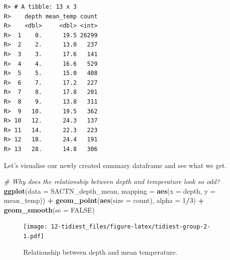 \documentclass[]{book}
\newenvironment{Shaded}{\begin{snugshade}}{\end{snugshade}}
\newcommand{\KeywordTok}[1]{\textcolor[rgb]{0.13,0.29,0.53}{\textbf{#1}}}
\newcommand{\DataTypeTok}[1]{\textcolor[rgb]{0.13,0.29,0.53}{#1}}
\newcommand{\DecValTok}[1]{\textcolor[rgb]{0.00,0.00,0.81}{#1}}
\newcommand{\StringTok}[1]{\textcolor[rgb]{0.31,0.60,0.02}{#1}}
\newcommand{\CommentTok}[1]{\textcolor[rgb]{0.56,0.35,0.01}{\textit{#1}}}
\newcommand{\OtherTok}[1]{\textcolor[rgb]{0.56,0.35,0.01}{#1}}
\newcommand{\OperatorTok}[1]{\textcolor[rgb]{0.81,0.36,0.00}{\textbf{#1}}}
\newcommand{\NormalTok}[1]{#1}
\theoremstyle{definition}
\theoremstyle{definition}
\theoremstyle{definition}
\theoremstyle{remark}
\begin{document}
\begin{Shaded}
\end{Shaded}

\begin{verbatim}
R> # A tibble: 13 x 3
R>    depth mean_temp count
R>    <dbl>     <dbl> <int>
R>  1    0.      19.5 26299
R>  2    2.      13.0   237
R>  3    3.      17.6   141
R>  4    4.      16.6   529
R>  5    5.      15.0   408
R>  6    7.      17.2   227
R>  7    8.      17.8   201
R>  8    9.      13.8   311
R>  9   10.      19.5   362
R> 10   12.      24.3   137
R> 11   14.      22.3   223
R> 12   18.      24.4   191
R> 13   28.      14.8   306
\end{verbatim}

Let's visualise our newly created summary dataframe and see what we get.

\begin{Shaded}
\begin{Highlighting}[]
\CommentTok{# Why does the relationship between depth and temperature look so odd?}
\KeywordTok{ggplot}\NormalTok{(}\DataTypeTok{data =}\NormalTok{ SACTN_depth_mean, }\DataTypeTok{mapping =} \KeywordTok{aes}\NormalTok{(}\DataTypeTok{x =}\NormalTok{ depth, }\DataTypeTok{y =}\NormalTok{ mean_temp)) }\OperatorTok{+}
\StringTok{  }\KeywordTok{geom_point}\NormalTok{(}\KeywordTok{aes}\NormalTok{(}\DataTypeTok{size =}\NormalTok{ count), }\DataTypeTok{alpha =} \DecValTok{1}\OperatorTok{/}\DecValTok{3}\NormalTok{) }\OperatorTok{+}
\StringTok{  }\KeywordTok{geom_smooth}\NormalTok{(}\DataTypeTok{se =} \OtherTok{FALSE}\NormalTok{)}
\end{Highlighting}
\end{Shaded}

\begin{figure}
\centering
\texttt{[image: 12-tidiest\_files/figure-latex/tidiest-group-2-1.pdf]}
\caption{\label{fig:tidiest-group-2}Relationship between depth and mean
temperature.}
\end{figure}
\end{document}
